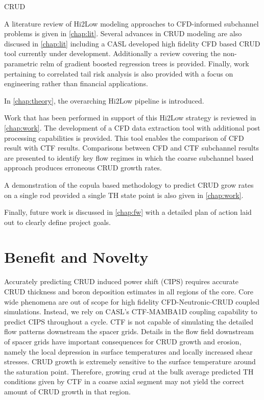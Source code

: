 CRUD 

A literature review of Hi2Low modeling approaches to CFD-informed subchannel
problems is given in \autoref{chap:lit}.  Several advances in CRUD modeling are
also discused in \autoref{chap:lit} including a CASL developed high fidelity
CFD based CRUD tool currently under development.  Additionally a review
covering the non-parametric relm of gradient boosted regression trees is
provided.  Finally, work pertaining to correlated tail risk analysis is also
provided with a focus on engineering rather than financial applications.

In \autoref{chap:theory}, the overarching Hi2Low pipeline is introduced.  

Work that has been performed in support of this Hi2Low strategy is reviewed in
\autoref{chap:work}.  The development of a CFD data extraction tool with
additional post processing capabilities is provided.  This tool enables the
comparison of CFD result with CTF results.  Comparisons between CFD and CTF
subchannel results are presented to identify key flow regimes in which the
coarse subchannel based approach produces erroneous CRUD growth rates.

A demonstration of the copula based methodology to predict CRUD grow rates on a
single rod provided a single TH state point is also given in
\autoref{chap:work}.

Finally, future work is discussed in \autoref{chap:fw} with a detailed plan of
action laid out to clearly define project goals.

\section{Benefit and Novelty}

Accurately predicting CRUD induced power shift (CIPS) requires accurate CRUD
thickness and boron deposition estimates in all regions of the core.  Core wide
phenomena are out of scope for high fidelity CFD-Neutronic-CRUD coupled
simulations.  Instead, we rely on CASL's CTF-MAMBA1D coupling capability to
predict CIPS throughout a cycle.  CTF is not capable of simulating the detailed
flow patterns downstream the spacer grids.  Details in the flow field
downstream of spacer grids have important consequences for CRUD growth and
erosion, namely the local depression in surface temperatures and locally
increased shear stresses.  CRUD growth is extremely sensitive to the surface
temperature around the saturation point.  Therefore, growing crud at the bulk
average predicted TH conditions given by CTF in a coarse axial segment may not
yield the correct amount of CRUD growth in that region.

